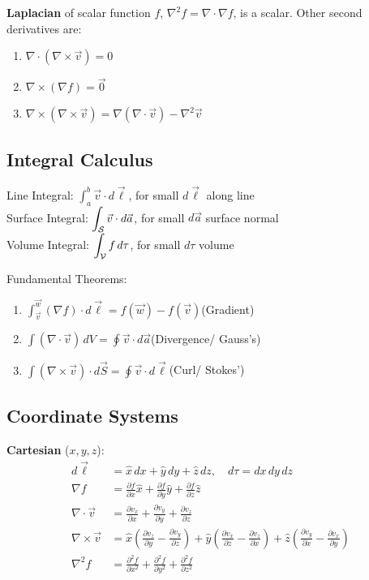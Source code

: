 \documentclass[12pt, a4paper]{article}
\begin{document}
\begin{multicols*}{3}
\textbf{Laplacian} of scalar function $f$, $\nabla^2 f = \nabla \cdot \nabla f$, is a scalar. Other second derivatives are:
\begin{enumerate}[\roman*.]
  \item $\nabla \cdot (\nabla \times \vec{v}) = 0$
  \item $\nabla \times (\nabla f) = \vec{0}$
  \item $\nabla \times (\nabla \times \vec{v}) = \nabla(\nabla \cdot \vec{v}) - \nabla^2 \vec{v}$
\end{enumerate}
\subsection{Integral Calculus}

Line Integral: $\displaystyle\int^b_a \vec{v}\cdot d\vec{\ell}$, for small $d \vec{\ell}$ along line\\
Surface Integral: $\displaystyle\int_{\mathcal{S}} \vec{v}\cdot d\vec{a}$, for small $d \vec{a}$ surface normal\\
Volume Integral: $\displaystyle\int_{\mathcal{V}} f\,d\tau$, for small $d\tau$ volume

Fundamental Theorems:
\begin{enumerate}[\roman*.]
  \item $\displaystyle\int^{\vec{w}}_{\vec{v}} (\nabla f)\cdot d\vec{\ell} = f(\vec{w}) - f(\vec{v})$\hfill(Gradient)
  \item $\displaystyle\int(\nabla\cdot \vec{v})\,dV = \oint \vec{v}\cdot d \vec{a}$\hfill(Divergence/ Gauss's)
  \item $\displaystyle\int(\nabla\times \vec{v})\cdot d \vec{S} = \oint \vec{v}\cdot d \vec{\ell}$\hfill(Curl/ Stokes')
\end{enumerate}
\vspace{-1em}
\colbreak
\subsection{Coordinate Systems}

\textbf{Cartesian} ($x, y, z$):
\begin{align*}
  d\vec{\ell} &= \hat{x}\,dx + \hat{y}\,dy + \hat{z}\,dz,\quad d\tau = dx\,dy\,dz\\
  \nabla f &= \frac{\partial f}{\partial x}\hat{x} + \frac{\partial f}{\partial y}\hat{y} + \frac{\partial f}{\partial z}\hat{z}\\
  \nabla \cdot \vec{v} &= \frac{\partial v_x}{\partial x} + \frac{\partial v_y}{\partial y} + \frac{\partial v_z}{\partial z}\\
  \nabla \times \vec{v} &= \hat{x}(\frac{\partial v_z}{\partial y} - \frac{\partial v_y}{\partial z}) + \hat{y}(\frac{\partial v_x}{\partial z} - \frac{\partial v_z}{\partial x}) + \hat{z}(\frac{\partial v_y}{\partial x} - \frac{\partial v_x}{\partial y})\\
    \nabla^2f &= \frac{\partial^2f}{\partial x^2} + \frac{\partial^2f}{\partial y^2} + \frac{\partial^2f}{\partial z^2}
\end{align*}


\end{multicols*}
\end{document}

